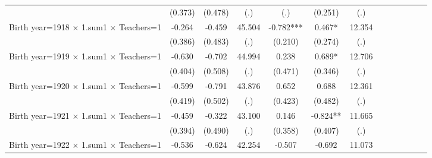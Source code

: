 {\begin{tabular}{l*{12}{c}}
                    &     (0.373)   &     (0.478)   &         (.)   &         (.)   &     (0.251)   &         (.)   &               &               &               &               &               &               \\
Birth year=1918 $\times$ 1.sum1 $\times$ Teachers=1&      -0.264   &      -0.459   &      45.504   &      -0.782***&       0.467*  &      12.354   &               &               &               &               &               &               \\
                    &     (0.386)   &     (0.483)   &         (.)   &     (0.210)   &     (0.274)   &         (.)   &               &               &               &               &               &               \\
Birth year=1919 $\times$ 1.sum1 $\times$ Teachers=1&      -0.630   &      -0.702   &      44.994   &       0.238   &       0.689*  &      12.706   &               &               &               &               &               &               \\
                    &     (0.404)   &     (0.508)   &         (.)   &     (0.471)   &     (0.346)   &         (.)   &               &               &               &               &               &               \\
Birth year=1920 $\times$ 1.sum1 $\times$ Teachers=1&      -0.599   &      -0.791   &      43.876   &       0.652   &       0.688   &      12.361   &               &               &               &               &               &               \\
                    &     (0.419)   &     (0.502)   &         (.)   &     (0.423)   &     (0.482)   &         (.)   &               &               &               &               &               &               \\
Birth year=1921 $\times$ 1.sum1 $\times$ Teachers=1&      -0.459   &      -0.322   &      43.100   &       0.146   &      -0.824** &      11.665   &               &               &               &               &               &               \\
                    &     (0.394)   &     (0.490)   &         (.)   &     (0.358)   &     (0.407)   &         (.)   &               &               &               &               &               &               \\
Birth year=1922 $\times$ 1.sum1 $\times$ Teachers=1&      -0.536   &      -0.624   &      42.254   &      -0.507   &      -0.692   &      11.073   &               &               &               &               &               &               \\

\end{tabular}}
